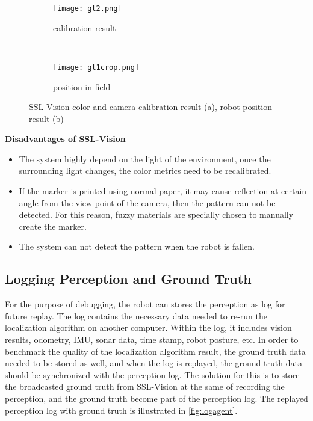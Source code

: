 \begin{figure}[h!]
        \centering
        \begin{subfigure}[h]{0.59\textwidth}
                \texttt{[image: gt2.png]}
                \caption{calibration result}
                \label{fig:calibration}
        \end{subfigure}%
        ~ %
        \begin{subfigure}[h]{0.41\textwidth}
                \texttt{[image: gt1crop.png]}
                \caption{position in field}
                \label{fig:position}
        \end{subfigure}%
	\caption{SSL-Vision color and camera calibration result (a), robot position result (b)}
	\label{fig:sslVision result}
\end{figure}


\noindent\textbf{Disadvantages of SSL-Vision}
\begin{itemize}
  \item The system highly depend on the light of the environment, once the surrounding light changes, the color metrics need to be recalibrated. 
  \item If the marker is printed using normal paper, it may cause reflection at certain angle from the view point of the camera, then the pattern can not be detected. For this reason, fuzzy materials are specially chosen to manually create the marker. 
  \item The system can not detect the pattern when the robot is fallen.
\end{itemize}

\subsection{Logging Perception and Ground Truth}
\label{sub:Logging Perception and Ground Truth}
For the purpose of debugging, the robot can stores the perception as log for future replay. The log contains the necessary data needed to re-run the localization algorithm on another computer. Within the log, it includes vision results, odometry, \gls{IMU}, sonar data, time stamp, robot posture, etc. In order to benchmark the quality of the localization algorithm result, the ground truth data needed to be stored as well, and when the log is replayed, the ground truth data should be synchronized with the perception log. The solution for this is to store the broadcasted ground truth from SSL-Vision at the same of recording the perception, and the ground truth become part of the perception log. The replayed perception log with ground truth is illustrated in \autoref{fig:logagent}.


